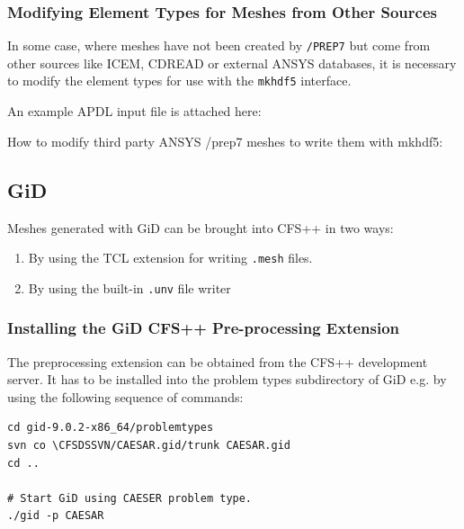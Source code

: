 \subsubsection{Modifying Element Types for Meshes from Other Sources}
\label{sec:ansys_modify_element_types}

In some case, where meshes have not been created by {\tt /PREP7} but come from
other sources like  ICEM, CDREAD or external ANSYS databases,  it is necessary
to modify the element types for use with the {\tt mkhdf5} interface.

\noindent    An    example    APDL    input    file    is    attached    here:

\noindent How  to modify third  party ANSYS /prep7  meshes to write  them with
mkhdf5:    

\subsection{GiD}

Meshes generated with GiD can be brought into CFS++ in two ways:
\begin{enumerate}
\item By using the TCL extension for writing {\tt .mesh} files.
\item By using the built-in {\tt .unv} file writer
\end{enumerate}

\subsubsection{Installing   the  GiD   CFS++   Pre-processing  Extension}

The  preprocessing  extension  can  be obtained  from  the  CFS++  development
server. It  has to  be installed  into the problem  types subdirectory  of GiD
e.g. by using the following sequence of commands:

\begin{verbatim}
cd gid-9.0.2-x86_64/problemtypes
svn co \CFSDSSVN/CAESAR.gid/trunk CAESAR.gid
cd ..

# Start GiD using CAESER problem type.
./gid -p CAESAR
\end{verbatim}

